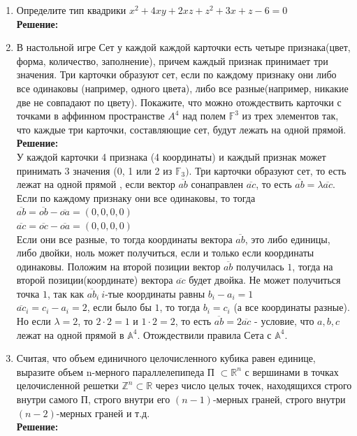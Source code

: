 \documentclass[]{book}
\theoremstyle{definition}
\newcommand{\bb}[1]{\mathbb{#1}}
\begin{document}
\begin{enumerate}[resume]
\item Определите тип квадрики $x^2+4xy+2xz+z^2+3x+z-6=0$\\
\textbf{Решение:}\\



\item В настольной игре Сет у каждой каждой карточки есть четыре признака(цвет, форма, количество, заполнение), причем каждый признак принимает три значения. Три карточки образуют сет, если по каждому признаку они либо все одинаковы (например, одного цвета), либо все разные(например, никакие две не совпадают по цвету). Покажите, что можно отождествить карточки с точками в аффинном пространстве $A^4$ над полем $\bb{F}^3$ из трех элементов так, что каждые три карточки, составляющие сет, будут лежать на одной прямой.\\
\textbf{Решение:}\\
У каждой карточки 4 признака (4 координаты) и каждый признак может принимать 3 значения (0, 1 или 2 из $\bb{F}_3)$. Три карточки образуют сет, то есть лежат на одной прямой , если вектор $\overline{ab}$ сонаправлен $\overline{ac}$, то есть $\overline{ab} = \lambda \overline{ac}$.\\
Если по каждому признаку они все одинаковы, то тогда $\overline{ab}=\overline{ob}-\overline{oa} = (0,0,0,0)$\\
$\overline{ac}=\overline{oc}-\overline{oa} = (0,0,0,0)$\\
Если они все разные, то тогда координаты вектора $\overline{ab}$, это либо единицы, либо двойки, ноль может получиться, если и только если координаты одинаковы. Положим на второй позиции вектор $\overline{ab}$ получилась $1$, тогда на второй позиции(координате) вектора $\overline{ac}$ будет двойка. Не может получиться точка $1$, так как $\overline{ab}_i \ i$-тые координаты равны $b_i - a_i = 1$\\
$\overline{ac}_i = c_i - a_i = 2$, если было бы $1$, то тогда $b_i = c_i$ (а все координаты разные).
Но если $\lambda = 2$, то $2\cdot 2 = 1$ и $1\cdot 2 = 2$, то есть $\overline{ab} = 2\overline{ac}$ - условие, что $a,b,c$ лежат на одной прямой в $\bb{A}^4$. Отождествили правила Сета с $\bb{A}^4$.
\item Считая, что объем единичного целочисленного кубика равен единице, выразите объем n-мерного параллелепипеда П $\subset \bb{R}^n$ с вершинами в точках целочисленной решетки $\bb{Z}^n \subset \bb{R}$ через число целых точек, находящихся строго внутри самого $\bb{П}$, строго внутри его $(n-1)$-мерных граней, строго внутри $(n-2)$-мерных граней и т.д.\\
\textbf{Решение:}\\

\end{enumerate}
\end{document}
